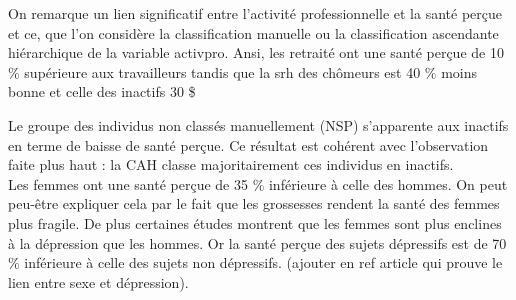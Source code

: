\documentclass{book}
\begin{document}

\bigskip

\noindent
On remarque un lien significatif entre l'activité professionnelle et la santé perçue et ce, que l'on considère la classification manuelle ou la classification ascendante hiérarchique de la variable activpro. Ansi, les retraité ont une santé perçue de 10 $\%$ supérieure aux travailleurs tandis que la srh des chômeurs est 40 $\%$ moins bonne et celle des inactifs 30 \$%

\noindent
Le groupe des individus non classés manuellement (NSP) s'apparente aux inactifs en terme de baisse de santé perçue. Ce résultat est cohérent avec l'observation faite plus haut : la CAH classe majoritairement ces individus en inactifs.\\
\bigskip
\noindent
Les femmes ont une santé perçue de 35 $\%$ inférieure à celle des hommes. On peut peu-être expliquer cela par le fait que les grossesses rendent la santé des femmes plus fragile. De plus certaines études montrent que les femmes sont plus enclines à la dépression que les hommes. Or la santé perçue des sujets dépressifs est de 70 $\%$ inférieure à celle des sujets non dépressifs. (ajouter en ref article qui prouve le lien entre sexe et dépression).\\
\bigskip
\end{document}
